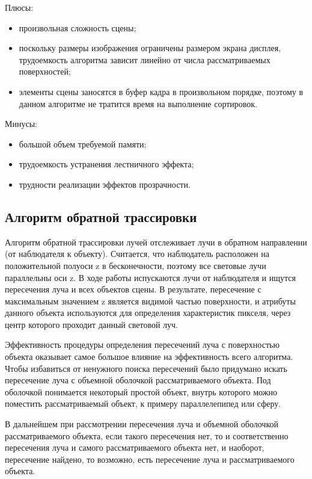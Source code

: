 Плюсы:

\begin{itemize}
	\item произвольная сложность сцены;
	\item поскольку размеры изображения ограничены размером экрана дисплея, трудоемкость алгоритма зависит линейно от числа рассматриваемых поверхностей;
	\item элементы сцены заносятся в буфер кадра в произвольном порядке, поэтому в данном алгоритме не тратится время на выполнение сортировок.
\end{itemize}

Минусы:

\begin{itemize}
	\item большой объем требуемой памяти;
	\item трудоемкость устранения лестничного эффекта;
	\item трудности реализации эффектов прозрачности.
\end{itemize}

\subsection{Алгоритм обратной трассировки}

Алгоритм обратной трассировки лучей отслеживает лучи в обратном направлении (от наблюдателя к объекту). Считается, что наблюдатель расположен на положительной полуоси z в бесконечности, поэтому все световые лучи параллельны оси z. В ходе работы испускаются лучи от наблюдателя и ищутся пересечения луча и всех объектов сцены.
В результате, пересечение с максимальным значением z является видимой частью поверхности, и атрибуты данного объекта используются для определения характеристик пикселя, через центр которого проходит данный световой луч. 

Эффективность процедуры определения пересечений луча с поверхностью объекта оказывает самое большое влияние на эффективность всего алгоритма. Чтобы избавиться от ненужного поиска пересечений было придумано искать пересечение луча с объемной оболочкой рассматриваемого объекта. Под оболочкой понимается некоторый простой объект, внутрь которого можно поместить рассматриваемый объект, к примеру параллелепипед или сферу. 

В дальнейшем при рассмотрении пересечения луча и объемной оболочкой рассматриваемого объекта, если такого пересечения нет, то и соответственно пересечения луча и самого рассматриваемого объекта нет, и наоборот, пересечение найдено, то возможно, есть пересечение луча и рассматриваемого объекта. 

